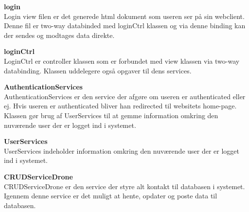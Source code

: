\textbf{login} \\
Login view filen er det generede html dokument som useren ser på sin webclient. Denne fil er two-way databinded med loginCtrl klassen og via denne binding kan der sendes og modtages data direkte.

\textbf{loginCtrl} \\
LoginCtrl er controller klassen som er forbundet med view klassen via two-way databinding. Klassen uddelegere også opgaver til dens services.

\textbf{AuthenticationServices} \\
AuthenticationServices er den service der afgøre om useren er authenticated eller ej. Hvis useren er authenticated bliver han redirected til websitets home-page. Klassen gør brug af UserServices til at gemme information omkring den nuværende user der er logget ind i systemet.

\textbf{UserServices}\\
UserServices indeholder information omkring den nuværende user der er logget ind i systemet.

\textbf{CRUDServiceDrone} \\
CRUDServiceDrone er den service der styre alt kontakt til databasen i systemet. Igennem denne service er det muligt at hente, opdater og poste data til databasen.